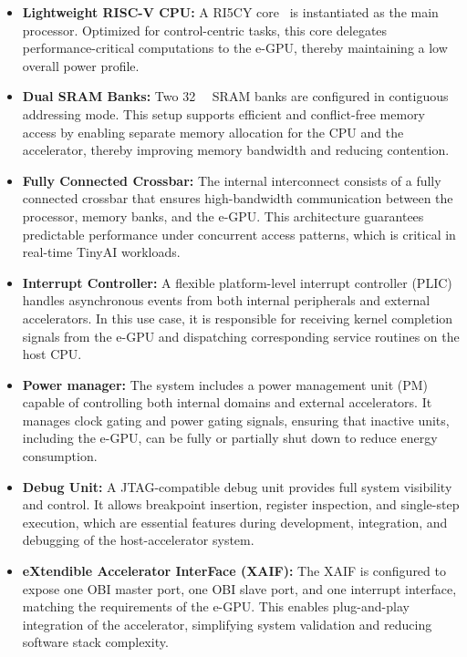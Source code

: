             \vspace{-1em}
            \begin{itemize}
                \item \textbf{Lightweight RISC-V CPU:} A \mbox{RI5CY} core~\cite{ri5cy} is instantiated as the main processor. Optimized for control-centric tasks, this core delegates performance-critical computations to the \mbox{e-GPU}, thereby maintaining a low overall power profile.
        
                \item \textbf{Dual SRAM Banks:} Two \SI{32}{\kibi\byte} SRAM banks are configured in contiguous addressing mode. This setup supports efficient and conflict-free memory access by enabling separate memory allocation for the CPU and the accelerator, thereby improving memory bandwidth and reducing contention.
        
                \item \textbf{Fully Connected Crossbar:} The internal interconnect consists of a fully connected crossbar that ensures high-bandwidth communication between the processor, memory banks, and the e-GPU. This architecture guarantees predictable performance under concurrent access patterns, which is critical in real-time TinyAI workloads.
        
                \item \textbf{Interrupt Controller:} A flexible platform-level interrupt controller (PLIC) handles asynchronous events from both internal peripherals and external accelerators. In this use case, it is responsible for receiving kernel completion signals from the \mbox{e-GPU} and dispatching corresponding service routines on the host CPU.
        
                \item \textbf{Power manager:} The system includes a power management unit (PM) capable of controlling both internal domains and external accelerators. It manages clock gating and power gating signals, ensuring that inactive units, including the \mbox{e-GPU}, can be fully or partially shut down to reduce energy consumption.
        
                \item \textbf{Debug Unit:} A JTAG-compatible debug unit provides full system visibility and control. It allows breakpoint insertion, register inspection, and single-step execution, which are essential features during development, integration, and debugging of the host-accelerator system.
        
                \item \textbf{eXtendible Accelerator InterFace (XAIF):} The XAIF is configured to expose one OBI master port, one OBI slave port, and one interrupt interface, matching the requirements of the \mbox{e-GPU}. This enables plug-and-play integration of the accelerator, simplifying system validation and reducing software stack complexity.
            \end{itemize}
            \vspace{-1em}
        
